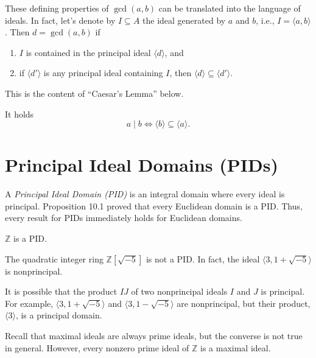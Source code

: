 \documentclass[11pt,a4paper]{article}
\begin{document}
\begin{rem}[10.1]
These defining properties of $\gcd(a, b)$ can be translated into the language of ideals. In fact, let's denote by $I \subseteq A$ the ideal generated by $a$ and $b$, i.e., $I = \langle a, b \rangle$. Then $d = \gcd(a, b)$ if
\begin{enumerate}[label=(\roman*)]
    \item $I$ is contained in the principal ideal $\langle d \rangle$, and
    \item if $\langle d' \rangle$ is any principal ideal containing $I$, then $\langle d \rangle \subseteq \langle d' \rangle$.
\end{enumerate}
\end{rem}

This is the content of “Caesar's Lemma” below.

\begin{lem}
It holds
\[
a \mid b \iff \langle b \rangle \subseteq \langle a \rangle.
\]
\end{lem}

\section{Principal Ideal Domains (PIDs)}

A \textit{Principal Ideal Domain (PID)} is an integral domain where every ideal is principal. Proposition 10.1 proved that every Euclidean domain is a PID. Thus, every result for PIDs immediately holds for Euclidean domains.

\begin{exa}[10.4]
$\mathbb{Z}$ is a PID.
\end{exa}

\begin{exa}[10.5]
The quadratic integer ring $\mathbb{Z}[\sqrt{-5}]$ is not a PID. In fact, the ideal $\langle 3, 1 + \sqrt{-5} \rangle$ is nonprincipal.
\end{exa}

\begin{rem}[10.2]
It is possible that the product $IJ$ of two nonprincipal ideals $I$ and $J$ is principal. For example, $\langle 3, 1 + \sqrt{-5} \rangle$ and $\langle 3, 1 - \sqrt{-5} \rangle$ are nonprincipal, but their product, $\langle 3 \rangle$, is a principal domain.
\end{rem}

Recall that maximal ideals are always prime ideals, but the converse is not true in general. However, every nonzero prime ideal of $\mathbb{Z}$ is a maximal ideal.
\end{document}
